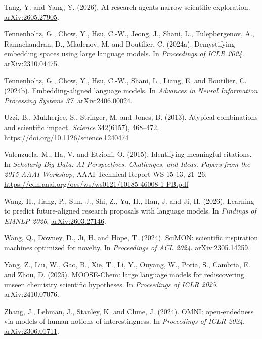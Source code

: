 \documentclass[
  10pt,
]{article}
\begin{document}
\hypertarget{ref-Tang2026}{}Tang, Y. and
Yang, Y. (2026). AI research agents
narrow scientific exploration.
\href{https://arxiv.org/abs/2605.27905}{arXiv:2605.27905}.

\hypertarget{ref-Tennenholtz2024a}{}Tennenholtz,
G., Chow, Y., Hsu, C.-W., Jeong, J.,
Shani, L., Tulepbergenov, A.,
Ramachandran, D., Mladenov, M. and
Boutilier, C. (2024a). Demystifying
embedding spaces using large language
models. In \emph{Proceedings of ICLR
2024}.
\href{https://arxiv.org/abs/2310.04475}{arXiv:2310.04475}.

\hypertarget{ref-Tennenholtz2024b}{}Tennenholtz,
G., Chow, Y., Hsu, C.-W., Shani, L.,
Liang, E. and Boutilier, C. (2024b).
Embedding-aligned language models. In
\emph{Advances in Neural Information
Processing Systems 37}.
\href{https://arxiv.org/abs/2406.00024}{arXiv:2406.00024}.

\hypertarget{ref-Uzzi2013}{}Uzzi, B.,
Mukherjee, S., Stringer, M. and Jones,
B. (2013). Atypical combinations and
scientific impact. \emph{Science}
342(6157), 468--472.
\url{https://doi.org/10.1126/science.1240474}

\hypertarget{ref-Valenzuela2015}{}Valenzuela,
M., Ha, V. and Etzioni, O. (2015).
Identifying meaningful citations. In
\emph{Scholarly Big Data: AI
Perspectives, Challenges, and Ideas,
Papers from the 2015 AAAI Workshop},
AAAI Technical Report WS-15-13, 21--26.
\url{https://cdn.aaai.org/ocs/ws/ws0121/10185-46008-1-PB.pdf}

\hypertarget{ref-Wang2026}{}Wang, H.,
Jiang, P., Sun, J., Shi, Z., Yu, H.,
Han, J. and Ji, H. (2026). Learning to
predict future-aligned research
proposals with language models. In
\emph{Findings of EMNLP 2026}.
\href{https://arxiv.org/abs/2603.27146}{arXiv:2603.27146}.

\hypertarget{ref-Wang2024}{}Wang, Q.,
Downey, D., Ji, H. and Hope, T. (2024).
SciMON: scientific inspiration machines
optimized for novelty. In
\emph{Proceedings of ACL 2024}.
\href{https://arxiv.org/abs/2305.14259}{arXiv:2305.14259}.

\hypertarget{ref-Yang2025}{}Yang, Z.,
Liu, W., Gao, B., Xie, T., Li, Y.,
Ouyang, W., Poria, S., Cambria, E. and
Zhou, D. (2025). MOOSE-Chem: large
language models for rediscovering unseen
chemistry scientific hypotheses. In
\emph{Proceedings of ICLR 2025}.
\href{https://arxiv.org/abs/2410.07076}{arXiv:2410.07076}.

\hypertarget{ref-Zhang2024}{}Zhang, J.,
Lehman, J., Stanley, K. and Clune, J.
(2024). OMNI: open-endedness via models
of human notions of interestingness. In
\emph{Proceedings of ICLR 2024}.
\href{https://arxiv.org/abs/2306.01711}{arXiv:2306.01711}.
\end{document}
